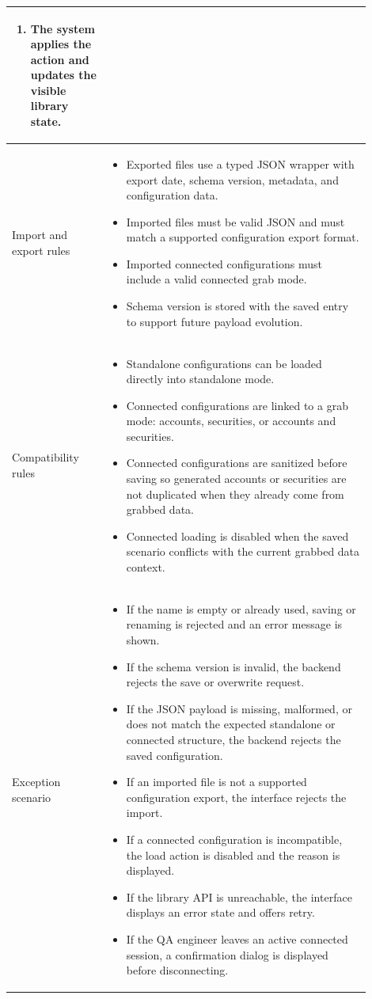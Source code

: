 \begin{longtable}{|P{0.24\linewidth}|P{0.66\linewidth}|}
\begin{enumerate}[leftmargin=*,nosep]
    \item The system applies the action and updates the visible library state.
\end{enumerate} \\
\hline
Import and export rules &
\begin{itemize}[leftmargin=*,nosep]
    \item Exported files use a typed JSON wrapper with export date, schema version, metadata, and configuration data.
    \item Imported files must be valid JSON and must match a supported configuration export format.
    \item Imported connected configurations must include a valid connected grab mode.
    \item Schema version is stored with the saved entry to support future payload evolution.
\end{itemize} \\
\hline
Compatibility rules &
\begin{itemize}[leftmargin=*,nosep]
    \item Standalone configurations can be loaded directly into standalone mode.
    \item Connected configurations are linked to a grab mode: accounts, securities, or accounts and securities.
    \item Connected configurations are sanitized before saving so generated accounts or securities are not duplicated when they already come from grabbed data.
    \item Connected loading is disabled when the saved scenario conflicts with the current grabbed data context.
\end{itemize} \\
\hline
Exception scenario &
\begin{itemize}[leftmargin=*,nosep]
    \item If the name is empty or already used, saving or renaming is rejected and an error message is shown.
    \item If the schema version is invalid, the backend rejects the save or overwrite request.
    \item If the JSON payload is missing, malformed, or does not match the expected standalone or connected structure, the backend rejects the saved configuration.
    \item If an imported file is not a supported configuration export, the interface rejects the import.
    \item If a connected configuration is incompatible, the load action is disabled and the reason is displayed.
    \item If the library API is unreachable, the interface displays an error state and offers retry.
    \item If the QA engineer leaves an active connected session, a confirmation dialog is displayed before disconnecting.
\end{itemize} \\
\hline
\end{longtable}
\renewcommand{\arraystretch}{1}


